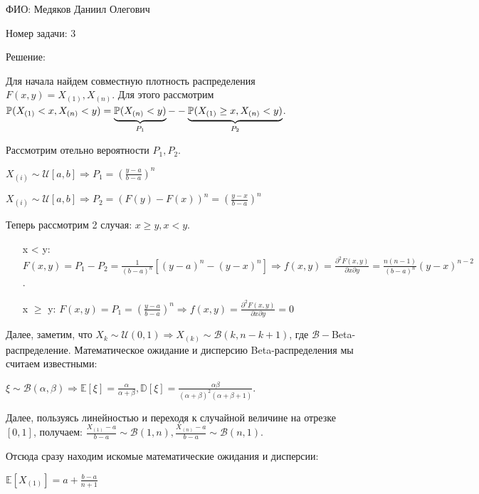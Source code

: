 \documentclass[14pt]{extarticle}
\begin{document}
ФИО: Медяков Даниил Олегович

\vspace{10pt}

Номер задачи: 3

\vspace{10pt}

Решение:

\vspace{10pt}

Для начала найдем совместную плотность распределения $F(x, y) = X_{(1)}, X_{(n)}$. Для этого рассмотрим $\mathbb P(X_{(1)} < x, X_{(n)} < y) = \underbrace{\mathbb P (X_{(n)} < y)}_{P_1} - \\ - \underbrace{\mathbb P (X_{(1)} \geq x, X_{(n)} < y)}_{P_2}$.

Рассмотрим отельно вероятности $P_1, P_2$.

$X_{(i)}\sim \mathcal U[a, b]\Rightarrow P_1 = \left(\frac{y - a}{b - a}\right)^n$

$X_{(i)}\sim \mathcal U[a, b]\Rightarrow P_2 = (F(y) - F(x))^n = \left(\frac{y - x}{b - a}\right)^n$

Теперь рассмотрим 2 случая: $x\geq y, x < y$.
\begin{itemize}
    \item [x < y:] $F(x, y) = P_1 - P_2 = \frac{1}{(b-a)^n}\left[(y-a)^n - (y-x)^n\right]
    \Rightarrow f(x, y) = \frac{\partial^2 F(x, y)}{\partial x\partial y} = \frac{n(n-1)}{(b-a)^n}(y-x)^{n-2}$.
    \item [x $\geq$ y:] $F(x, y) = P_1 =  \left(\frac{y - a}{b - a}\right)^n \Rightarrow f(x, y) = \frac{\partial^2 F(x, y)}{\partial x\partial y} = 0$
\end{itemize}

Далее, заметим, что $X_k \sim \mathcal U(0, 1)\Rightarrow X_{(k)}\sim \mathcal{B}(k, n-k+1)$, где $\mathcal{B} - $Beta-распределение. Математическое ожидание и дисперсию Beta-распределения мы считаем известными:

$\xi\sim\mathcal{B}(\alpha, \beta)\Rightarrow\mathbb E[\xi] = \frac{\alpha}{\alpha + \beta}, \mathbb D [\xi] = \frac{\alpha\beta}{(\alpha +\beta)^2(\alpha + \beta + 1)}$.

Далее, пользуясь линейностью и переходя к случайной величине на отрезке $[0, 1]$, получаем: $\frac{X_{(1)} - a}{b-a}\sim \mathcal{B}(1, n), \frac{X_{(n)} - a}{b-a}\sim \mathcal{B}(n, 1)$.

Отсюда сразу находим искомые математические ожидания и дисперсии:

$\mathbb E[X_{(1)}] = a + \frac{b-a}{n+1}$
\end{document}
